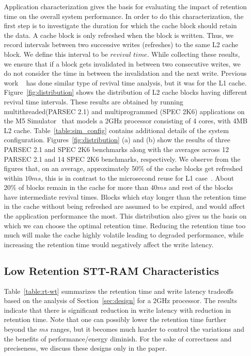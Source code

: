 Application characterization gives the basis for evaluating the impact of retention time on the
overall system performance. In order to do this characterization, the first step is to investigate
the duration for which the cache block should retain the data.  A cache block is only refreshed when
the block is written. Thus, we record intervals between two successive writes (refreshes) to the same
L2 cache block. We define this interval to be $revival$ $time$. While collecting these results, we
ensure that if a block gets invalidated in between two consecutive writes, we do not consider the
time in between the invalidation and the next write. Previous work ~\cite{3t1d-cache} has done
similar type of revival time analysis, but it was for the L1 cache. Figure~\ref{fig:distribution}
shows the distribution of L2 cache blocks having different revival time intervals. These results are
obtained by running multithreaded(PARSEC 2.1) and multiprogrammed (SPEC 2K6)
applications on the M5 Simulator~\cite{M5} that models a 2GHz processor consisting of 4 cores, with
4MB L2 cache. Table~\ref{table:sim_config} contains additional details of the system configuration.
Figures~\ref{fig:distribution} (a) and (b) show the results of three PARSEC 2.1
and SPEC 2K6 benchmarks along
with the averages across 12 PARSEC 2.1  and 14 SPEC 2K6 benchmarks, respectively. We observe from the figures
that, on an average, approximately 50\% of the cache blocks get refreshed within $10ms$, this is
in contrast to the microsecond reuse for L1 case~\cite{3t1d-cache}. About 20\% of blocks remain in
the cache for more than $40ms$ and rest of the blocks have intermediate revival times. Blocks
which stay longer than the retention time in the cache without being refreshed are assumed to be
expired, and would affect the application performance the most. This distribution also gives us the
basis on which we can choose the optimal retention time. Reducing the retention time too much will
make the cache highly volatile leading to degraded performance, while increasing the retention time
would negatively affect the write latency.



\subsection{Low Retention STT-RAM Characteristics}
Table~\ref{table:rt-wt} summarizes the retention time and write latency tradeoffs based on the analysis of Section~\ref{sec:design}
for a 2GHz processor.
The results indicate that there is significant reduction in write latency with reduction in retention time.
Note that one can possibly lower the retention time further beyond the $ms$ ranges, but it becomes much harder to control the variations and the benefits of performance/energy diminish. For the sake of correctness and preciseness, we discuss these designs only in the paper.

